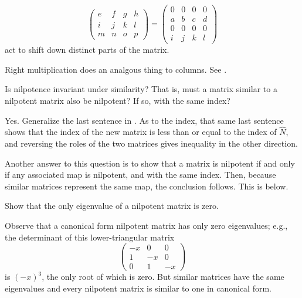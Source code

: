 \begin{exercises}
\begin{answer}
\begin{equation*}
\begin{pmatrix}
          e  &f  &g  &h  \\
          i  &j  &k  &l  \\
          m  &n  &o  &p
        \end{pmatrix}
        =
        \begin{pmatrix}
          0  &0  &0  &0  \\
          a  &b  &c  &d  \\       
          0  &0  &0  &0  \\
          i  &j  &k  &l  
        \end{pmatrix}
      \end{equation*}
      act to shift down distinct parts of the matrix.

      Right multiplication does an analgous thing to columns.
      See .
    \end{answer}
  \item 
    Is nilpotence invariant under similarity?
    That is, must a matrix similar to a nilpotent matrix also be nilpotent?
    If so, with the same index?
    \begin{answer}
      Yes.
      Generalize the last sentence in .
      As to the index, that same last sentence shows that the index of the new 
      matrix is less than or equal to the index of $\hat{N}$, and reversing
      the roles of the two matrices gives inequality in the other direction.

      Another answer to this question is to show that a matrix is 
      nilpotent if and only if any associated map is nilpotent, and 
      with the same index.
      Then, because similar matrices represent the same map, the conclusion
      follows.
      This is  below.
    \end{answer}  
  \recommended \item
    Show that the only eigenvalue of a nilpotent matrix is zero.
    \begin{answer}
      Observe that a canonical form nilpotent matrix has only
      zero eigenvalues; e.g., the determinant of this lower-triangular matrix
      \begin{equation*}
         \begin{pmatrix}
           -x  &0  &0  \\
            1  &-x &0  \\
            0  &1  &-x
         \end{pmatrix}
      \end{equation*}
      is \( (-x)^3 \), the only root of which is zero.
      But similar matrices have the same eigenvalues and every nilpotent
      matrix is similar to one in canonical form.   


\end{answer}
\end{exercises}
